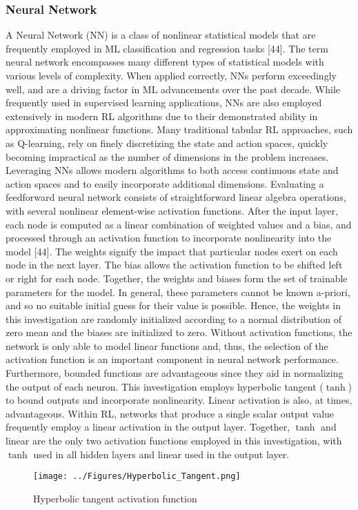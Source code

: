 \documentclass[conference]{IEEEtran}
\begin{document}
\subsubsection{Neural Network}
A Neural Network (NN) is a class of nonlinear statistical models that are frequently employed in ML classification and regression tasks [44]. The term neural network encompasses many different types of statistical models with various levels of complexity. When applied correctly, NNs perform exceedingly well, and are a driving factor in ML advancements over the past decade. While frequently used in supervised learning applications, NNs are also employed extensively in modern RL algorithms due to their demonstrated ability in approximating nonlinear functions. Many traditional tabular RL approaches, such as Q-learning, rely on finely discretizing the state and action spaces, quickly becoming impractical as the number of dimensions in the problem increases. Leveraging NNs allows modern algorithms to both access continuous state and action spaces and to easily incorporate additional dimensions.
Evaluating a feedforward neural network consists of straightforward linear algebra operations, with several nonlinear element-wise activation functions. After the input layer, each node is computed as a linear combination of weighted values and a bias, and processed through an activation function to incorporate nonlinearity into the model [44]. The weights signify the impact that particular nodes exert on each node in the next layer. The bias allows the activation function to be shifted left or right for each node. Together, the weights and biases form the set of trainable parameters for the model. In general, these parameters cannot be known a-priori, and so no suitable initial guess for their value is possible. Hence, the weights in this investigation are randomly initialized according to a normal distribution of zero mean and the biases are initialized to zero.
Without activation functions, the network is only able to model linear functions and, thus, the selection of the activation function is an important component in neural network performance. Furthermore, bounded functions are advantageous since they aid in normalizing the output of each neuron. This investigation employs hyperbolic tangent (\(\tanh\)) to bound outputs and incorporate nonlinearity. Linear activation is also, at times, advantageous. Within RL, networks that produce a single scalar output value frequently employ a linear activation in the output layer. Together, \(\tanh\) and linear are the only two activation functions employed in this investigation, with \(\tanh\) used in all hidden layers and linear used in the output layer.
\begin{figure}[H]
    \centering
    \texttt{[image: ../Figures/Hyperbolic\_Tangent.png]}
    \caption{Hyperbolic tangent activation function}
\label{fig:tanh}
\end{figure}
\end{document}
